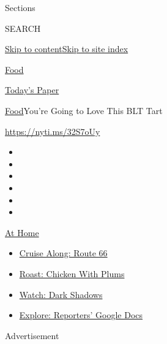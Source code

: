 Sections

SEARCH

\protect\hyperlink{site-content}{Skip to
content}\protect\hyperlink{site-index}{Skip to site index}

\href{https://www.nytimes3xbfgragh.onion/section/food}{Food}

\href{https://myaccount.nytimes3xbfgragh.onion/auth/login?response_type=cookie\&client_id=vi}{}

\href{https://www.nytimes3xbfgragh.onion/section/todayspaper}{Today's
Paper}

\href{/section/food}{Food}\textbar{}You're Going to Love This BLT Tart

\url{https://nyti.ms/32S7oUy}

\begin{itemize}
\item
\item
\item
\item
\item
\item
\end{itemize}

\href{https://www.nytimes3xbfgragh.onion/spotlight/at-home?action=click\&pgtype=Article\&state=default\&region=TOP_BANNER\&context=at_home_menu}{At
Home}

\begin{itemize}
\tightlist
\item
  \href{https://www.nytimes3xbfgragh.onion/2020/09/07/travel/route-66.html?action=click\&pgtype=Article\&state=default\&region=TOP_BANNER\&context=at_home_menu}{Cruise
  Along: Route 66}
\item
  \href{https://www.nytimes3xbfgragh.onion/2020/09/04/dining/sheet-pan-chicken.html?action=click\&pgtype=Article\&state=default\&region=TOP_BANNER\&context=at_home_menu}{Roast:
  Chicken With Plums}
\item
  \href{https://www.nytimes3xbfgragh.onion/2020/09/04/arts/television/dark-shadows-stream.html?action=click\&pgtype=Article\&state=default\&region=TOP_BANNER\&context=at_home_menu}{Watch:
  Dark Shadows}
\item
  \href{https://www.nytimes3xbfgragh.onion/interactive/2020/at-home/even-more-reporters-editors-diaries-lists-recommendations.html?action=click\&pgtype=Article\&state=default\&region=TOP_BANNER\&context=at_home_menu}{Explore:
  Reporters' Google Docs}
\end{itemize}

Advertisement


